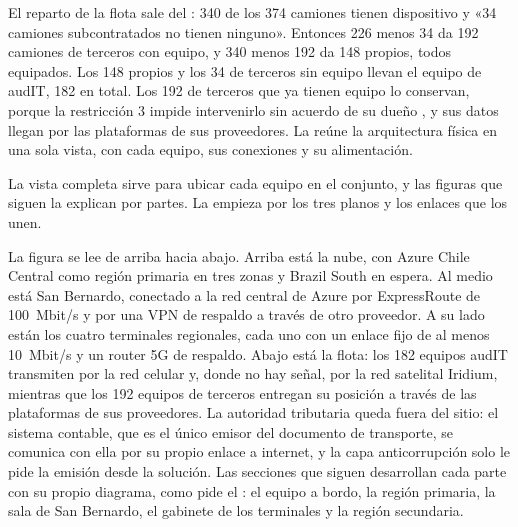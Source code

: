El reparto de la flota sale del : 340 de los 374 camiones tienen dispositivo y
«34 camiones subcontratados no tienen ninguno». Entonces 226 menos 34 da 192 camiones de terceros con
equipo, y 340 menos 192 da 148 propios, todos equipados. Los 148 propios y los 34 de terceros sin
equipo llevan el equipo de audIT, 182 en total. Los 192 de terceros que ya tienen equipo lo conservan,
porque la restricción 3 impide intervenirlo sin acuerdo de su dueño , y sus
datos llegan por las plataformas de sus proveedores. La  reúne la
arquitectura física en una sola vista, con cada equipo, sus conexiones y su alimentación.


La vista completa sirve para ubicar cada equipo en el conjunto, y las figuras que siguen la explican por
partes. La  empieza por los tres planos y los enlaces que los unen.


La figura se lee de arriba hacia abajo. Arriba está la nube, con Azure Chile Central como región
primaria en tres zonas y Brazil South en espera. Al medio está San Bernardo, conectado a la red central
de Azure por ExpressRoute de 100~Mbit/s y por una VPN de respaldo a través de otro proveedor. A su
lado están los cuatro terminales regionales, cada uno con un enlace fijo de al menos 10~Mbit/s y un
router 5G de respaldo. Abajo está la flota: los 182 equipos audIT transmiten por la red celular y,
donde no hay señal, por la red satelital Iridium, mientras que los 192 equipos de terceros entregan su
posición a través de las plataformas de sus proveedores. La autoridad tributaria queda fuera del sitio:
el sistema contable, que es el único emisor del documento de transporte, se comunica con ella por su
propio enlace a internet, y la capa anticorrupción solo le pide la emisión desde la solución. Las secciones que siguen desarrollan cada
parte con su propio diagrama, como pide el : el equipo a bordo, la región
primaria, la sala de San Bernardo, el gabinete de los terminales y la región secundaria.

